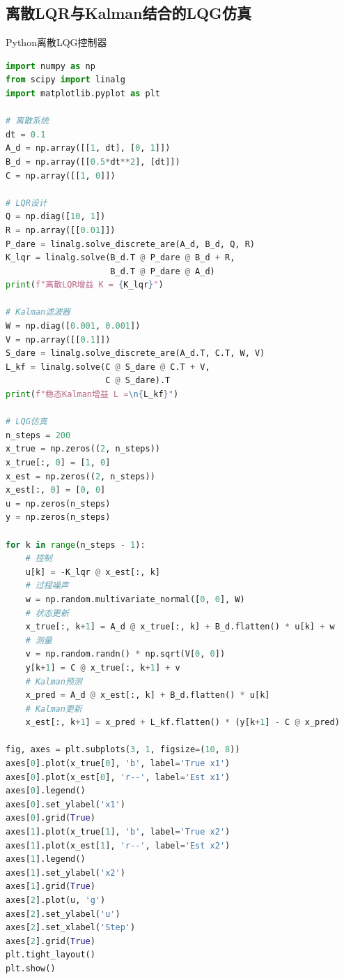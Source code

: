 \subsection{离散LQR与Kalman结合的LQG仿真}

\begin{mycode}{Python离散LQG控制器}
\begin{lstlisting}[language=Python]
import numpy as np
from scipy import linalg
import matplotlib.pyplot as plt

# 离散系统
dt = 0.1
A_d = np.array([[1, dt], [0, 1]])
B_d = np.array([[0.5*dt**2], [dt]])
C = np.array([[1, 0]])

# LQR设计
Q = np.diag([10, 1])
R = np.array([[0.01]])
P_dare = linalg.solve_discrete_are(A_d, B_d, Q, R)
K_lqr = linalg.solve(B_d.T @ P_dare @ B_d + R,
                     B_d.T @ P_dare @ A_d)
print(f"离散LQR增益 K = {K_lqr}")

# Kalman滤波器
W = np.diag([0.001, 0.001])
V = np.array([[0.1]])
S_dare = linalg.solve_discrete_are(A_d.T, C.T, W, V)
L_kf = linalg.solve(C @ S_dare @ C.T + V,
                    C @ S_dare).T
print(f"稳态Kalman增益 L =\n{L_kf}")

# LQG仿真
n_steps = 200
x_true = np.zeros((2, n_steps))
x_true[:, 0] = [1, 0]
x_est = np.zeros((2, n_steps))
x_est[:, 0] = [0, 0]
u = np.zeros(n_steps)
y = np.zeros(n_steps)

for k in range(n_steps - 1):
    # 控制
    u[k] = -K_lqr @ x_est[:, k]
    # 过程噪声
    w = np.random.multivariate_normal([0, 0], W)
    # 状态更新
    x_true[:, k+1] = A_d @ x_true[:, k] + B_d.flatten() * u[k] + w
    # 测量
    v = np.random.randn() * np.sqrt(V[0, 0])
    y[k+1] = C @ x_true[:, k+1] + v
    # Kalman预测
    x_pred = A_d @ x_est[:, k] + B_d.flatten() * u[k]
    # Kalman更新
    x_est[:, k+1] = x_pred + L_kf.flatten() * (y[k+1] - C @ x_pred)

fig, axes = plt.subplots(3, 1, figsize=(10, 8))
axes[0].plot(x_true[0], 'b', label='True x1')
axes[0].plot(x_est[0], 'r--', label='Est x1')
axes[0].legend()
axes[0].set_ylabel('x1')
axes[0].grid(True)
axes[1].plot(x_true[1], 'b', label='True x2')
axes[1].plot(x_est[1], 'r--', label='Est x2')
axes[1].legend()
axes[1].set_ylabel('x2')
axes[1].grid(True)
axes[2].plot(u, 'g')
axes[2].set_ylabel('u')
axes[2].set_xlabel('Step')
axes[2].grid(True)
plt.tight_layout()
plt.show()
\end{lstlisting}
\end{mycode}

